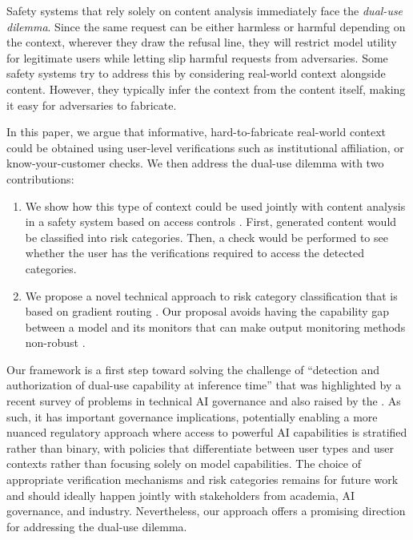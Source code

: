 \documentclass{article}
\theoremstyle{plain}
\theoremstyle{definition}
\theoremstyle{remark}
\begin{document}
Safety systems that rely solely on content analysis immediately face
the \emph{dual-use dilemma}. Since the same request can be either
harmless or harmful depending on the context, wherever they draw the
refusal line, they will restrict model utility for legitimate users
while letting slip harmful requests from adversaries. Some safety
systems try to address this by considering real-world context
alongside content. However, they typically infer the context from the
content itself, making it easy for adversaries to fabricate.

In this paper, we argue that informative, hard-to-fabricate
real-world context could be obtained using user-level verifications
such as institutional affiliation, or know-your-customer checks. We
then address the dual-use dilemma with two contributions:
\begin{enumerate}
  \item We show how this type of context could be used jointly with content analysis in a safety system based on access controls \cite{butler1974}. First, generated content would be classified into risk categories. Then, a check would be performed to see whether the user has the verifications required to access the detected categories.
  \item We propose a novel technical approach to risk
    category classification that is based on gradient routing \cite{cloud2024gradientroutingmaskinggradients}. Our proposal avoids having the capability gap between a model and its monitors that can make output monitoring methods non-robust \cite{jin2024jailbreakinglargelanguagemodels}.
\end{enumerate}

Our framework is a first step toward solving the challenge of ``detection and authorization of dual-use capability at inference time'' that was highlighted by a recent survey of problems in technical AI governance \cite{reuel2025openproblemstechnicalai} and also raised by the \citet{NIST_AI_800_1_ipd_2024}.
As such, it has important governance implications, potentially enabling a more nuanced regulatory approach where access to powerful AI capabilities is stratified rather than binary, with policies that differentiate between user types and user contexts rather than focusing solely on model capabilities.
The choice of appropriate verification mechanisms and risk categories remains for future work and should ideally happen jointly with stakeholders from academia, AI governance, and industry.
Nevertheless, our approach offers a promising direction for addressing the dual-use dilemma.
\end{document}
